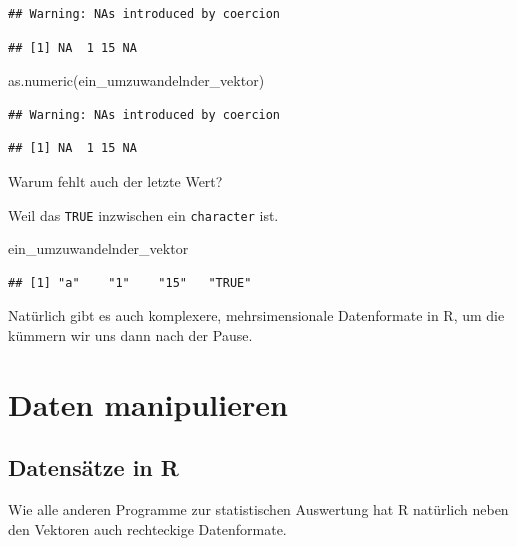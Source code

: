 \documentclass[
]{book}
\newenvironment{Shaded}{\begin{snugshade}}{\end{snugshade}}
\newcommand{\FunctionTok}[1]{\textcolor[rgb]{0.00,0.00,0.00}{#1}}
\newcommand{\NormalTok}[1]{#1}
\begin{document}
\begin{verbatim}
## Warning: NAs introduced by coercion
\end{verbatim}

\begin{verbatim}
## [1] NA  1 15 NA
\end{verbatim}

\begin{Shaded}
\begin{Highlighting}[]
\FunctionTok{as.numeric}\NormalTok{(ein\_umzuwandelnder\_vektor)}
\end{Highlighting}
\end{Shaded}

\begin{verbatim}
## Warning: NAs introduced by coercion
\end{verbatim}

\begin{verbatim}
## [1] NA  1 15 NA
\end{verbatim}

Warum fehlt auch der letzte Wert?

Weil das \texttt{TRUE} inzwischen ein \texttt{character} ist.

\begin{Shaded}
\begin{Highlighting}[]
\NormalTok{ein\_umzuwandelnder\_vektor}
\end{Highlighting}
\end{Shaded}

\begin{verbatim}
## [1] "a"    "1"    "15"   "TRUE"
\end{verbatim}

Natürlich gibt es auch komplexere, mehrsimensionale Datenformate in R, um die kümmern wir uns dann nach der Pause.

\hypertarget{daten-manipulieren}{%
\chapter{Daten manipulieren}\label{daten-manipulieren}}

\hypertarget{datensuxe4tze-in-r}{%
\section{Datensätze in R}\label{datensuxe4tze-in-r}}

Wie alle anderen Programme zur statistischen Auswertung hat R natürlich neben den Vektoren auch rechteckige Datenformate.
\end{document}
